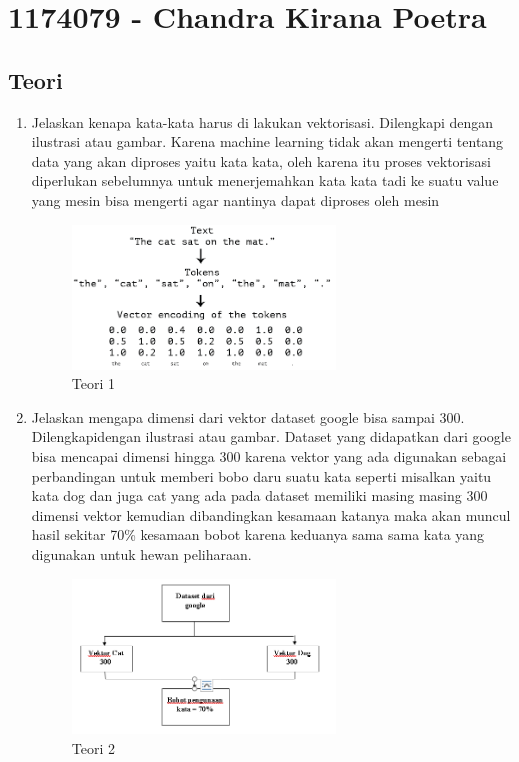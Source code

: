 \section{1174079 - Chandra Kirana Poetra}
\subsection{Teori}
\begin{enumerate}
	\item Jelaskan kenapa kata-kata harus di lakukan vektorisasi. Dilengkapi dengan ilustrasi atau gambar.
	\hfill\break
	Karena machine learning tidak akan mengerti tentang data yang akan diproses yaitu kata kata, oleh karena itu proses vektorisasi diperlukan sebelumnya untuk menerjemahkan kata kata tadi ke suatu value yang mesin bisa mengerti agar nantinya dapat diproses oleh mesin
	\hfill\break
	\begin{figure}[H]
		\includegraphics[width=7cm]{figures/1174079/5/1.png}
		\centering
		\caption{Teori 1}
	\end{figure}

	\item Jelaskan mengapa dimensi dari vektor dataset google bisa sampai 300. Dilengkapidengan ilustrasi atau gambar.
	\hfill\break
    Dataset yang didapatkan dari google bisa mencapai dimensi hingga 300 karena vektor yang ada digunakan sebagai perbandingan untuk memberi bobo daru suatu kata
    seperti misalkan yaitu kata dog dan juga cat yang ada pada dataset memiliki masing masing 300 dimensi vektor kemudian dibandingkan kesamaan katanya maka akan muncul
    hasil sekitar 70\% kesamaan bobot karena keduanya sama sama kata yang digunakan untuk hewan peliharaan.
	\hfill\break
	\begin{figure}[H]
		\includegraphics[width=7cm]{figures/1174079/5/2.png}
		\centering
		\caption{Teori 2}
	\end{figure}


\end{enumerate}
